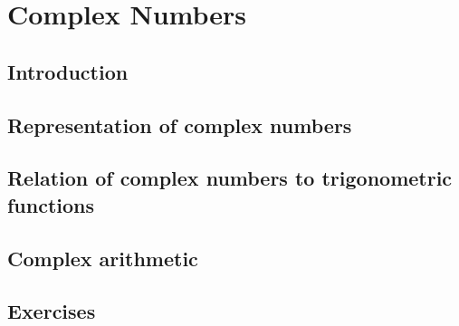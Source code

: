 \chapter{Complex Numbers}
\section{Introduction}
\section{Representation of complex numbers}
\section{Relation of complex numbers to trigonometric functions}
\section{Complex arithmetic}
\section{Exercises}
